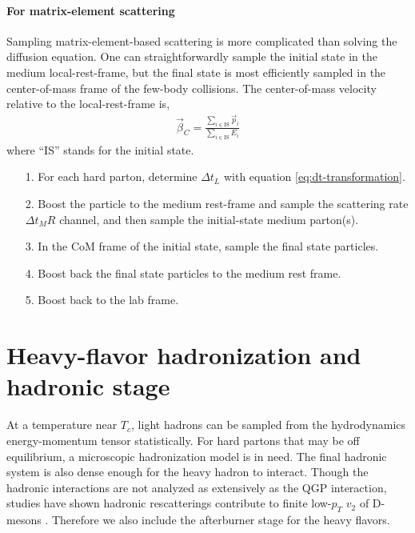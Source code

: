 \paragraph{For matrix-element scattering} Sampling matrix-element-based scattering is more complicated than solving the diffusion equation.
One can straightforwardly sample the initial state in the medium local-rest-frame, but the final state is most efficiently sampled in the center-of-mass frame of the few-body collisions.
The center-of-mass velocity relative to the local-rest-frame is,
\begin{eqnarray}
\vec{\beta}_{C} = \frac{\sum_{i\in \textrm{IS}} \vec{p}_i}{\sum_{i\in \textrm{IS}} E_i}
\end{eqnarray}
where ``IS'' stands for the initial state.
\begin{itemize}
\item[1.] For each hard parton, determine $\Delta t_L$ with equation \ref{eq:dt-transformation}.
\item[2.] Boost the particle to the medium rest-frame and sample the scattering rate $\Delta t_M R$ channel, and then sample the initial-state medium parton(s).
\item[3.] In the CoM frame of the initial state, sample the final state particles.
\item[4.] Boost back the final state particles to the medium rest frame.
\item[5.] Boost back to the lab frame.
\end{itemize}

\section{Heavy-flavor hadronization and hadronic stage}
\label{section:hadronization}
At a temperature near $T_c$, light hadrons can be sampled from the hydrodynamics energy-momentum tensor statistically.
For hard partons that may be off equilibrium, a microscopic hadronization model is in need.
The final hadronic system is also dense enough for the heavy hadron to interact.
Though the hadronic interactions are not analyzed as extensively as the QGP interaction, studies have shown hadronic rescatterings contribute to finite low-$p_T$ $v_2$ of D-mesons \cite{Cao:2015hia}.
Therefore we also include the afterburner stage for the heavy flavors.

